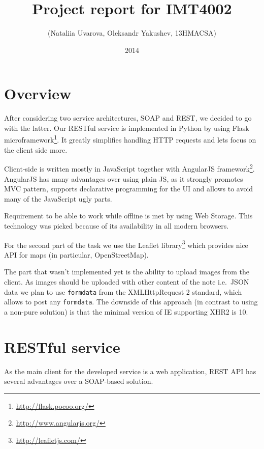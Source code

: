 \documentclass[12pt,a4paper]{article}
\begin{document}
\lstset{numbers=left,tabsize=4,breaklines=true,title=\lstname,}
\title{Project report for IMT4002}
\author{(Nataliia Uvarova, Oleksandr Yakushev, 13HMACSA)}
\date{2014}
\maketitle
\onehalfspacing{}

\section{Overview}

After considering two service architectures, SOAP and REST, we decided
to go with the latter. Our RESTful service is implemented in Python by
using Flask microframework\footnote{\url{http://flask.pocoo.org/}}.
It greatly simplifies handling HTTP requests and lets focus on the
client side more.

Client-side is written mostly in JavaScript together with AngularJS
framework\footnote{\url{http://www.angularjs.org/}}. AngularJS has
many advantages over using plain JS, as it strongly promotes MVC
pattern, supports declarative programming for the UI and allows to
avoid many of the JavaScript ugly parts.

Requirement to be able to work while offline is met by using Web Storage.
This technology was picked because of its availability in all modern browsers.

For the second part of the task we use the Leaflet
library\footnote{\url{http://leafletjs.com/}} which provides nice API
for maps (in particular, OpenStreetMap).

The part that wasn't implemented yet is the ability to upload images
from the client. As images should be uploaded with other content of
the note i.e.\ JSON data we plan to use \texttt{formdata} from the
XMLHttpRequest 2 standard, which allows to post any \texttt{formdata}.
The downside of this approach (in contrast to using a non-pure
solution) is that the minimal version of IE supporting XHR2 is 10.

\section{RESTful service}

As the main client for the developed service is a web application,
REST API has several advantages over a SOAP-based solution.
\end{document}
